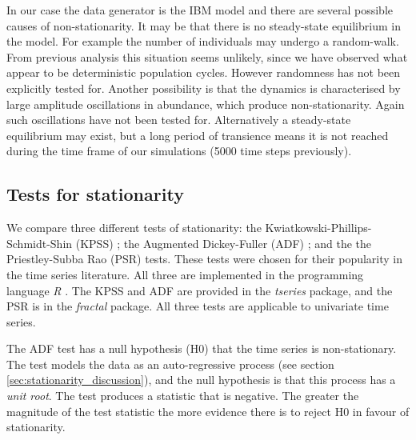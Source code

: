 In our case the data generator is the IBM model and there are several possible causes of non-stationarity. It may be that there is no steady-state equilibrium in the model. For example the number of individuals may undergo a random-walk. From previous analysis this situation seems unlikely, since we have observed what appear to be deterministic population cycles. However randomness has not been explicitly tested for. Another possibility is that the dynamics is characterised by large amplitude oscillations in abundance, which produce non-stationarity. Again such oscillations have not been tested for. Alternatively a steady-state equilibrium may exist, but a long period of transience means it is not reached during the time frame of our simulations (5000 time steps previously).


\subsection{Tests for stationarity}
\label{sec:stat_tests}

We compare three different tests of stationarity: the Kwiatkowski-Phillips-Schmidt-Shin (KPSS) \cite{kwiatkowski1992testing}; the Augmented Dickey-Fuller (ADF) \cite{said1984testing}; and the the Priestley-Subba Rao (PSR) \cite{priestley1969test} tests. These tests were chosen for their popularity in the time series literature. All three are implemented in the programming language \emph{R} \cite{Rlanguage}. The KPSS and ADF are provided in the \emph{tseries} package, and the PSR is in the \emph{fractal} package. All three tests are applicable to univariate time series.

The ADF test has a null hypothesis (H0) that the time series is non-stationary. The test models the data as an auto-regressive process (see section \ref{sec:stationarity_discussion}), and the null hypothesis is that this process has a \emph{unit root}. The test produces a statistic that is negative. The greater the magnitude of the test statistic the more evidence there is to reject H0 in favour of stationarity.

